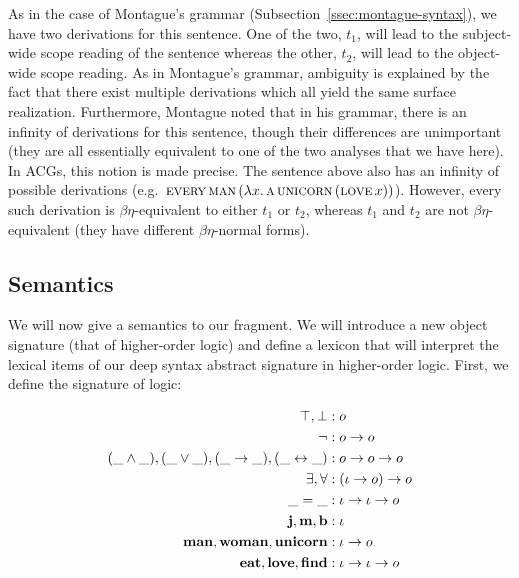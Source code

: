 As in the case of Montague's grammar
(Subsection~\ref{ssec:montague-syntax}), we have two derivations for this
sentence. One of the two, $t_1$, will lead to the subject-wide scope
reading of the sentence whereas the other, $t_2$, will lead to the
object-wide scope reading. As in Montague's grammar, ambiguity is explained
by the fact that there exist multiple derivations which all yield the same
surface realization. Furthermore, Montague noted that in his grammar, there
is an infinity of derivations for this sentence, though their differences
are unimportant (they are all essentially equivalent to one of the two
analyses that we have here). In ACGs, this notion is made precise. The
sentence above also has an infinity of possible derivations (e.g.\
$\textsc{every}\,\textsc{man}\,(\lambda x.\, \textsc{a}\,\textsc{unicorn}\,(\textsc{love}\,x))$). However,
every such derivation is $\beta\eta$-equivalent to either $t_1$ or $t_2$,
whereas $t_1$ and $t_2$ are not $\beta\eta$-equivalent (they have different
$\beta\eta$-normal forms).


\subsection{Semantics}
\label{ssec:acg-semantics}

We will now give a semantics to our fragment. We will introduce a new
object signature (that of higher-order logic) and define a lexicon that
will interpret the lexical items of our deep syntax abstract signature in
higher-order logic. First, we define the signature of logic:

\begin{align*}
  \top, \bot &: o \\
  \lnot &: o \to o \\
  (\_ \land \_), (\_ \lor \_), (\_ \to \_), (\_ \leftrightarrow \_) &: o \to o \to o \\
  \exists, \forall &: (\iota \to o) \to o \\
  \_ = \_ &: \iota \to \iota \to o \\
  \textbf{j}, \textbf{m}, \textbf{b} &: \iota \\
  \textbf{man}, \textbf{woman}, \textbf{unicorn} &: \iota \to o \\
  \textbf{eat}, \textbf{love}, \textbf{find} &: \iota \to \iota \to o
\end{align*}

